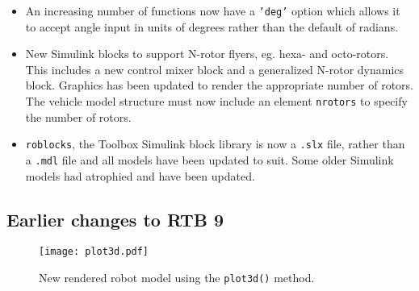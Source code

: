 \documentclass[a4paper]{report}
\begin{document}
\begin{itemize}
\item An increasing number of functions now have a \texttt{'deg'} option which allows it to accept angle input in units of degrees rather than the default of
radians.
\item New Simulink blocks to support N-rotor flyers, eg. hexa- and octo-rotors.  This includes a new control mixer block and a generalized
N-rotor dynamics block.  Graphics has been updated to render the appropriate number of rotors.  The vehicle model structure must now include
an element \texttt{nrotors} to specify the number of rotors.
\item \texttt{roblocks}, the Toolbox Simulink block library is now a \texttt{.slx} file, rather than a \texttt{.mdl} file and all models have been updated
to suit.   Some older Simulink models had atrophied and have been updated.

\end{itemize}

\subsection{Earlier changes to RTB 9}

\begin{figure}[b]
\centering
\texttt{[image: plot3d.pdf]}
\caption{New rendered robot model using the \texttt{plot3d()} method.}\label{fig:plot3d}
\end{figure}
\end{document}
